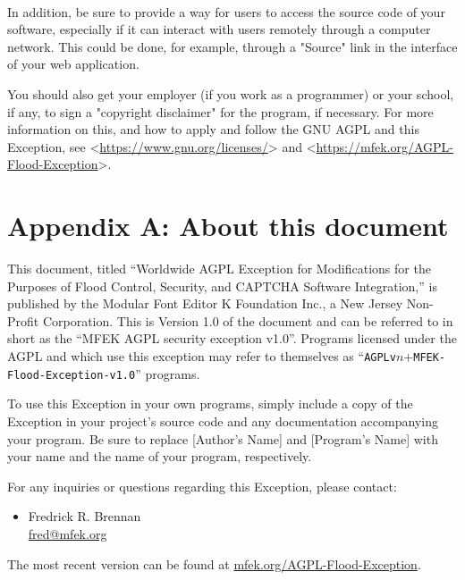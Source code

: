 \documentclass[a5paper,14pt]{extreport}
\begin{document}
~\\

In addition, be sure to provide a way for users to access the source code of your software,
especially if it can interact with users remotely through a computer network. This could be done,
for example, through a "Source" link in the interface of your web application.

You should also get your employer (if you work as a programmer) or your school, if any, to sign a
"copyright disclaimer" for the program, if necessary. For more information on this, and how to apply
and follow the GNU AGPL and this Exception, see <\url{https://www.gnu.org/licenses/}> and
<\url{https://mfek.org/AGPL-Flood-Exception}>.

\section*{Appendix A: About this document}
This document, titled ``Worldwide AGPL Exception for Modifications for the Purposes of Flood Control, Security, and CAPTCHA Software Integration,'' is published by the Modular Font Editor K Foundation Inc., a New Jersey Non-Profit Corporation. This is Version 1.0 of the document and can be referred to in short as the ``MFEK AGPL security exception v1.0''. Programs licensed under the AGPL and which use this exception may refer to themselves as ``\texttt{AGPLv$n$$+$MFEK-Flood-Exception-v1.0}'' programs.

To use this Exception in your own programs, simply include a copy of the Exception in your project's source code and any documentation accompanying your program. Be sure to replace [Author's Name] and [Program's Name] with your name and the name of your program, respectively.

For any inquiries or questions regarding this Exception, please contact:

\begin{itemize}
	\item Fredrick R. Brennan \\
\href{mailto:fred@mfek.org}{fred@mfek.org}
\end{itemize}

The most recent version can be found at \url{mfek.org/AGPL-Flood-Exception}.
\end{document}
